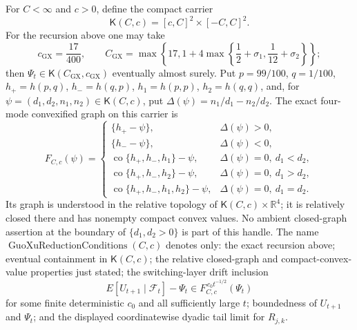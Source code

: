 For \(C<\infty\) and \(c>0\), define the compact carrier
\[
\mathsf K(C,c)=[c,C]^2\times[-C,C]^2.
\]
For the recursion above one may take
\[
c_{\mathrm{GX}}=\frac{17}{400},\qquad
C_{\mathrm{GX}}=\max\left\{17,1+4\max\left\{\frac12+\sigma_1,\frac1{12}+\sigma_2\right\}\right\};
\]
then \(\Psi_t\in\mathsf K(C_{\mathrm{GX}},c_{\mathrm{GX}})\) eventually almost surely. Put \(p=99/100\), \(q=1/100\), \(h_+=h(p,q)\), \(h_-=h(q,p)\), \(h_1=h(p,p)\), \(h_2=h(q,q)\), and, for \(\psi=(d_1,d_2,n_1,n_2)\in\mathsf K(C,c)\), put \(\Delta(\psi)=n_1/d_1-n_2/d_2\). The exact four-mode convexified graph on this carrier is
\[
F_{C,c}(\psi)=
\begin{cases}
\{h_+-\psi\},&\Delta(\psi)>0,\\
\{h_--\psi\},&\Delta(\psi)<0,\\
\operatorname{co}\{h_+,h_-,h_1\}-\psi,&\Delta(\psi)=0,\ d_1<d_2,\\
\operatorname{co}\{h_+,h_-,h_2\}-\psi,&\Delta(\psi)=0,\ d_1>d_2,\\
\operatorname{co}\{h_+,h_-,h_1,h_2\}-\psi,&\Delta(\psi)=0,\ d_1=d_2.
\end{cases}
\]
Its graph is understood in the relative topology of \(\mathsf K(C,c)\times\mathbb R^4\); it is relatively closed there and has nonempty compact convex values. No ambient closed-graph assertion at the boundary of \(\{d_1,d_2>0\}\) is part of this handle. The name \(\operatorname{GuoXuReductionConditions}(C,c)\) denotes only: the exact recursion above; eventual containment in \(\mathsf K(C,c)\); the relative closed-graph and compact-convex-value properties just stated; the switching-layer drift inclusion
\[
E[U_{t+1}\mid\mathcal F_t]-\Psi_t\in F_{C,c}^{\,c_0t^{-1/2}}(\Psi_t)
\]
for some finite deterministic \(c_0\) and all sufficiently large \(t\); boundedness of \(U_{t+1}\) and \(\Psi_t\); and the displayed coordinatewise dyadic tail limit for \(R_{j,k}\).

